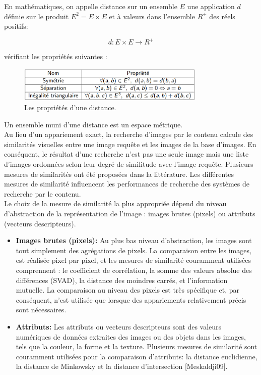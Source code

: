 En mathématiques, on appelle distance sur un ensemble $E$ une application $d$ définie sur le produit $E^2 = E \times E$ et à valeurs dans l'ensemble $R^+$ des réels positifs:

\begin{equation}
	d: E \times E \rightarrow R^+
\end{equation}

vérifiant les propriétés suivantes :
\begin{figure}[H]
	\centering
	\includegraphics[width=0.8\textwidth]{Figures/distanceProp.png} %
	\caption{Les propriétés d'une distance.}
\end{figure}

Un ensemble muni d'une distance est un espace métrique.\\

Au lieu d'un appariement exact, la recherche d’images par le contenu calcule des similarités visuelles entre une image requête et les images de la base d'images. En conséquent, le résultat d'une recherche n'est pas une seule image mais une liste d'images ordonnées selon leur degré de similitude avec l'image requête. Plusieurs mesures de similarités ont été proposées dans la littérature. Les différentes mesures de similarité influencent les performances de recherche des systèmes de recherche par le contenu.\\

Le choix de la mesure de similarité la plus appropriée dépend du niveau d'abstraction de la
représentation de l'image : images brutes (pixels) ou attributs (vecteurs descripteurs).
\begin{itemize}
	\item \textbf{Images brutes (pixels): }Au plus bas niveau d'abstraction, les images sont tout simplement des agrégations de pixels. La comparaison entre les images, est réalisée pixel par pixel, et les mesures de similarité couramment utilisées comprennent : le coefficient de corrélation, la somme des valeurs absolue des différences (SVAD), la distance des moindres carrés, et l’information mutuelle.
	La comparaison au niveau des pixels est très spécifique et, par conséquent, n'est utilisée que lorsque des appariements relativement précis sont nécessaires.
	
	\item \textbf{Attributs:} Les attributs ou vecteurs descripteurs sont des valeurs numériques de données extraites des images ou des objets dans les images, tels que la couleur, la forme et la texture. Plusieurs mesures de similarité sont couramment utilisées pour la comparaison d’attributs: la distance euclidienne, la distance de Minkowsky et la distance d’intersection  [Meskaldji09].
\end{itemize}

